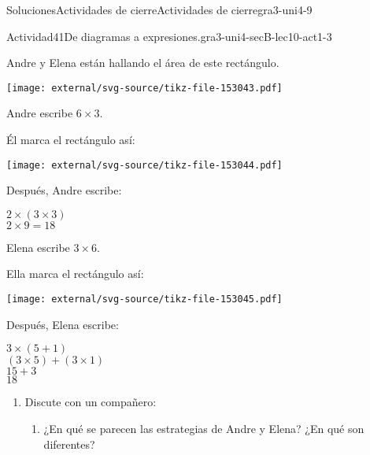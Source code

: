 \documentclass[twoside,10pt,]{article}
\begin{document}
\begin{solutions-section}{Soluciones}{Actividades de cierre}{}{Actividades de cierre}{}{}{gra3-uni4-9}
\begin{activitysolution}{Actividad}{41}{De diagramas a expresiones.}{gra3-uni4-secB-lec10-act1-3}
\begin{sidebyside}{2}{0.025}{0.025}{0.05}%
\begin{sbspanel}{0.4}%
Andre y Elena están hallando el área de este rectángulo.%
\end{sbspanel}%
\begin{sbspanel}{0.5}%
\texttt{[image: external/svg-source/tikz-file-153043.pdf]}
\end{sbspanel}%
\end{sidebyside}%
\begin{sidebyside}{3}{0}{0}{0.065}%
\begin{sbspanel}{0.27}%
Andre escribe \(6\times 3\).%
\end{sbspanel}%
\begin{sbspanel}{0.35}%
Él marca el rectángulo así:%
\par
\texttt{[image: external/svg-source/tikz-file-153044.pdf]}
\end{sbspanel}%
\begin{sbspanel}{0.25}%
Después, Andre escribe:%
\par
\(2 \times (3 \times 3)\)\\
 \(2 \times 9 = 18\)%
\end{sbspanel}%
\end{sidebyside}%
\begin{sidebyside}{3}{0}{0}{0.065}%
\begin{sbspanel}{0.27}%
Elena escribe \(3\times 6\).%
\end{sbspanel}%
\begin{sbspanel}{0.35}%
Ella marca el rectángulo así:%
\par
\texttt{[image: external/svg-source/tikz-file-153045.pdf]}
\end{sbspanel}%
\begin{sbspanel}{0.25}%
Después, Elena escribe:%
\par
\(3 \times (5 + 1)\)\\
 \((3 \times 5) + (3 \times 1)\)\\
 \(15+3\)\\
 \(18\)%
\end{sbspanel}%
\end{sidebyside}%
%
\begin{enumerate}
\item{}Discute con un compañero:%
%
\begin{enumerate}
\item{}¿En qué se parecen las estrategias de Andre y Elena? ¿En qué son diferentes?%

\end{enumerate}
\end{enumerate}
\end{activitysolution}
\end{solutions-section}
\end{document}
